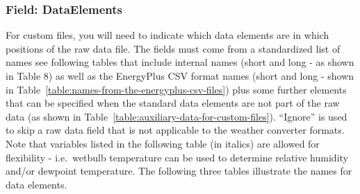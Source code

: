 \subsubsection{Field: DataElements}\label{field-dataelements}

For custom files, you will need to indicate which data elements are in which positions of the raw data file. The fields must come from a standardized list of names see following tables that include internal names (short and long - as shown in Table 8) as well as the EnergyPlus CSV format names (short and long - shown in Table~\ref{table:names-from-the-energyplus-csv-files}) plus some further elements that can be specified when the standard data elements are not part of the raw data (as shown in Table~\ref{table:auxiliary-data-for-custom-files}). ``Ignore'' is used to skip a raw data field that is not applicable to the weather converter formats. Note that variables listed in the following table (in italics) are allowed for flexibility - i.e.~wetbulb temperature can be used to determine relative humidity and/or dewpoint temperature. The following three tables illustrate the names for data elements.

